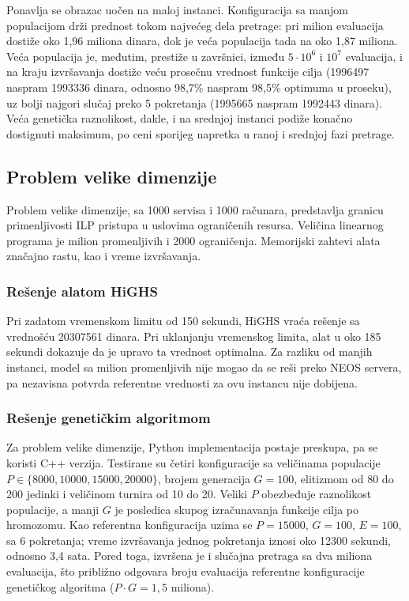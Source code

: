 \documentclass[12pt]{article}
\begin{document}
Ponavlja se obrazac uočen na maloj instanci. Konfiguracija sa manjom populacijom drži prednost tokom najvećeg dela pretrage: pri milion evaluacija dostiže oko 1,96 miliona dinara, dok je veća populacija tada na oko 1,87 miliona. Veća populacija je, međutim, prestiže u završnici, između $5 \cdot 10^6$ i $10^7$ evaluacija, i na kraju izvršavanja dostiže veću prosečnu vrednost funkcije cilja (1996497 naspram 1993336 dinara, odnosno 98,7\% naspram 98,5\% optimuma u proseku), uz bolji najgori slučaj preko 5 pokretanja (1995665 naspram 1992443 dinara). Veća genetička raznolikost, dakle, i na srednjoj instanci podiže konačno dostignuti maksimum, po ceni sporijeg napretka u ranoj i srednjoj fazi pretrage.

\subsection{Problem velike dimenzije}

Problem velike dimenzije, sa 1000 servisa i 1000 računara, predstavlja granicu primenljivosti ILP pristupa u uslovima ograničenih resursa. Veličina linearnog programa je milion promenljivih i 2000 ograničenja. Memorijski zahtevi alata značajno rastu, kao i vreme izvršavanja.

\subsubsection{Rešenje alatom HiGHS}

Pri zadatom vremenskom limitu od 150 sekundi, HiGHS vraća rešenje sa vrednošću 20307561 dinara. Pri uklanjanju vremenskog limita, alat u oko 185 sekundi dokazuje da je upravo ta vrednost optimalna. Za razliku od manjih instanci, model sa milion promenljivih nije mogao da se reši preko NEOS servera, pa nezavisna potvrda referentne vrednosti za ovu instancu nije dobijena.

\subsubsection{Rešenje genetičkim algoritmom}

Za problem velike dimenzije, Python implementacija postaje preskupa, pa se koristi C++ verzija. Testirane su četiri konfiguracije sa veličinama populacije $P \in \{8000, 10000, 15000, 20000\}$, brojem generacija $G = 100$, elitizmom od 80 do 200 jedinki i veličinom turnira od 10 do 20. Veliki $P$ obezbeđuje raznolikost populacije, a manji $G$ je posledica skupog izračunavanja funkcije cilja po hromozomu. Kao referentna konfiguracija uzima se $P = 15000$, $G = 100$, $E = 100$, sa 6 pokretanja; vreme izvršavanja jednog pokretanja iznosi oko 12300 sekundi, odnosno 3,4 sata. Pored toga, izvršena je i slučajna pretraga sa dva miliona evaluacija, što približno odgovara broju evaluacija referentne konfiguracije genetičkog algoritma ($P \cdot G = 1{,}5$ miliona).
\end{document}
